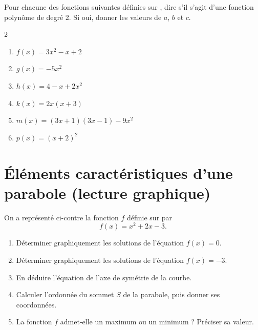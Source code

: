 \documentclass[11pt,a4paper]{book}
\begin{document}
\exerciceDS{}

Pour chacune des fonctions suivantes définies sur \R, dire s'il s'agit d'une fonction polynôme de degré 2. Si oui, donner les valeurs de $a$, $b$ et $c$.

\begin{multicols}{2}
	\begin{enumerate}[label=\textbf{\alph*)}]
		\item $f(x)=3x^2-x+2$
		\item $g(x)=-5x^2$
		\item $h(x)=4-x+2x^2$
		\item $k(x)=2x(x+3)$
		\item $m(x)=(3x+1)(3x-1)-9x^2$
		\item $p(x)=(x+2)^2$
	\end{enumerate}
\end{multicols}

\section*{\color{green!55!black}Éléments caractéristiques d'une parabole (lecture graphique)}

\exerciceDS{}

\begin{minipage}[c]{0.5\linewidth}
	On a représenté ci-contre la fonction $f$ définie sur \R par
	$$f(x)=x^2+2x-3.$$
	\begin{enumerate}[label=\textbf{\arabic*)}]
		\item Déterminer graphiquement les solutions de l'équation $f(x)=0$.
		\item Déterminer graphiquement les solutions de l'équation $f(x)=-3$.
		\item En déduire l'équation de l'axe de symétrie de la courbe.
		\item Calculer l'ordonnée du sommet $S$ de la parabole, puis donner ses coordonnées.
		\item La fonction $f$ admet-elle un maximum ou un minimum ? Préciser sa valeur.
	\end{enumerate}
\end{minipage} \hfill
\begin{minipage}[c]{0.46\linewidth}
	\begin{center}
	\end{center}
\end{minipage}
\end{document}

